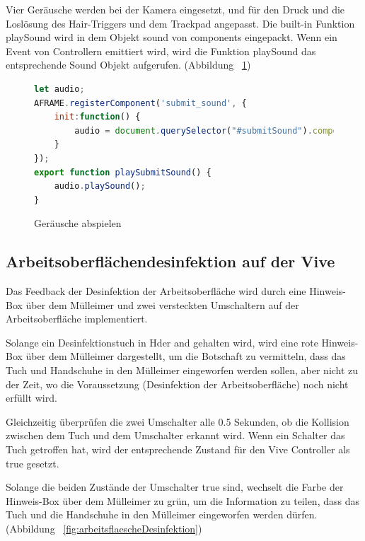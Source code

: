  Vier Geräusche werden bei der Kamera eingesetzt, und für den Druck und die Loslösung des Hair-Triggers und dem Trackpad angepasst. Die built-in Funktion {\selectfont playSound} wird in dem Objekt {\selectfont sound} von {\selectfont components} eingepackt. Wenn ein Event von Controllern emittiert wird, wird die Funktion {\selectfont playSound} das entsprechende Sound Objekt aufgerufen. (Abbildung ~\ref{fig:submitSound})
 
\begin{figure}[ht]
\vspace*{1em}
\centering
\caption[Geräusche abspielen]{Geräusche abspielen}
\begin{lstlisting}[language=JavaScript, style=htmlcssjs]
let audio;
AFRAME.registerComponent('submit_sound', {
    init:function() {
        audio = document.querySelector("#submitSound").components.sound;
    }
});
export function playSubmitSound() {
    audio.playSound();
}
\end{lstlisting}
\label{fig:submitSound} 
\end{figure}
 
 \subsection{Arbeitsoberflächendesinfektion auf der Vive}
 Das Feedback der Desinfektion der Arbeitsoberfläche wird durch eine Hinweis-Box über dem Mülleimer und zwei versteckten Umschaltern auf der Arbeitsoberfläche implementiert.
 
 Solange ein Desinfektionstuch in Hder and gehalten wird, wird eine rote Hinweis-Box über dem Mülleimer dargestellt, um die Botschaft zu vermitteln, dass das Tuch und Handschuhe in den Mülleimer eingeworfen werden sollen, aber nicht zu der Zeit, wo die Voraussetzung (Desinfektion der Arbeitsoberfläche) noch nicht erfüllt wird.
 
 Gleichzeitig überprüfen die zwei Umschalter alle 0.5 Sekunden, ob die Kollision zwischen dem Tuch und dem Umschalter erkannt wird. Wenn ein Schalter das Tuch getroffen hat, wird der entsprechende Zustand für den Vive Controller als {\selectfont true} gesetzt.
 
 Solange die beiden Zustände der Umschalter {\selectfont true} sind, wechselt die Farbe der Hinweis-Box über dem Mülleimer zu grün, um die Information zu teilen, dass das Tuch und die Handschuhe in den Mülleimer eingeworfen werden dürfen. (Abbildung ~\ref{fig:arbeitsflaescheDesinfektion})
 
